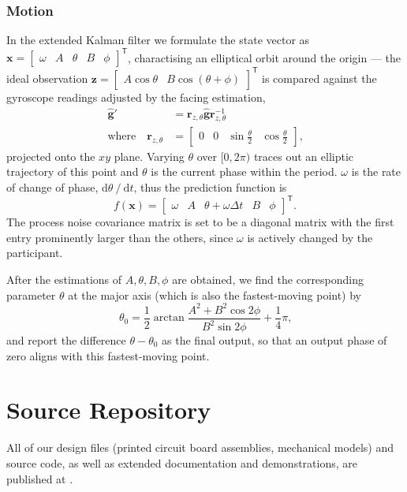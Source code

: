 \documentclass{nime-alternate} %
\begin{document}
\subsubsection{Motion}
\label{appendix:est-motion}
In the extended Kalman filter we formulate the state vector as $\mathbf{x} = \begin{bmatrix} \omega & A & \theta & B & \phi \end{bmatrix}^\mathsf{T}$, charactising an elliptical orbit around the origin --- the ideal observation $\mathbf{z} = \begin{bmatrix} A \cos \theta & B \cos (\theta + \phi) \end{bmatrix}^\mathsf{T}$ is compared against the gyroscope readings adjusted by the facing estimation,
\begin{equation*}
\begin{split}
\hat{\mathbf{g}}' &= \mathbf{r}_{z, \theta} \hat{\mathbf{g}} \mathbf{r}_{z, \theta}^{-1} \\
\text{where}\quad \mathbf{r}_{z, \theta} &= \begin{bmatrix} 0 & 0 & \sin \frac \theta 2 & \cos \frac \theta 2 \end{bmatrix}
\text{,}
\end{split}
\end{equation*}
projected onto the $xy$ plane. Varying $\theta$ over $[0, 2\pi)$ traces out an elliptic trajectory of this point and $\theta$ is the current phase within the period. $\omega$ is the rate of change of phase, $\mathrm{d}{\theta} \mathbin{\mathop{/}} \mathrm{d}t$, thus the prediction function is
\begin{equation*}
f(\mathbf{x}) = \begin{bmatrix} \omega & A & \theta + \omega \Delta t & B & \phi \end{bmatrix}^\mathsf{T}\text{.}
\end{equation*}
The process noise covariance matrix is set to be a diagonal matrix with the first entry prominently larger than the others, since $\omega$ is actively changed by the participant. %

After the estimations of $A, \theta, B, \phi$ are obtained, we find the corresponding parameter $\theta$ at the major axis (which is also the fastest-moving point) by
\begin{equation*}
\theta_0 = \frac 1 2 \mathop{\mathrm{arctan}} \frac {A^2 + B^2 \cos 2\phi} {B^2 \sin 2\phi} + \frac 1 4 \pi\text{,}
\end{equation*}
and report the difference $\theta - \theta_0$ as the final output, so that an output phase of zero aligns with this fastest-moving point.

\section{Source Repository}
All of our design files (printed circuit board assemblies, mechanical models) and source code, as well as extended documentation and demonstrations, are published at \newline {}.
\end{document}
